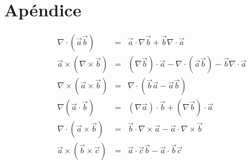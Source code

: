 \documentclass[a4paper,11pt]{report}
\begin{document}

\chapter{Apéndice}
\begin{eqnarray}
  \nabla \cdot (\vec{a}\vec{b}) &=& \vec{a} \cdot \nabla \vec{b} + \vec{b}\nabla \cdot \vec{a} \label{apen_1}\\ 
  \vec{a} \times (\nabla \times \vec{b}) &=& (\nabla \vec{b})\cdot \vec{a}- \nabla \cdot (\vec{a}\vec{b})-\vec{b}\nabla \cdot \vec{a}  \label{apen_2}\\
  \nabla \times(\vec{a} \times \vec{b}) &=& \nabla \cdot (\vec{b}\vec{a}-\vec{a}\vec{b}) \label{apen_3}\\
  \nabla (\vec{a}\cdot \vec{b}) &=& (\nabla\vec{a})\cdot \vec{b}+(\nabla\vec{b})\cdot \vec{a} \label{apen_4}\\
  \nabla \cdot (\vec{a} \times \vec{b}) &=& \vec{b} \cdot \nabla \times \vec{a} - \vec{a} \cdot \nabla \times \vec{b} \label{apen_5} \\
  \vec{a}\times (\vec{b} \times \vec{c}) &=& \vec{a} \cdot \vec{c}\vec{b} - \vec{a}\cdot \vec{b}\vec{c} \label{apen_6}
\end{eqnarray}








\end{document}
